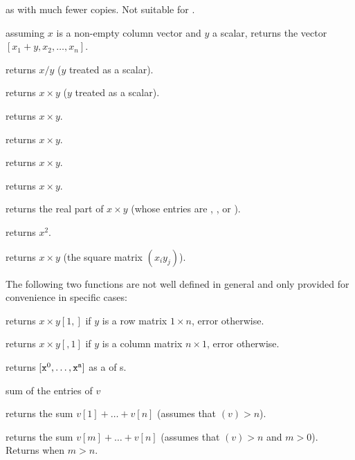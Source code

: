  as  with much
fewer copies. Not suitable for .

 assuming $x$ is a non-empty column vector
and $y$ a scalar, returns the vector $[x_1 + y, x_2,\dots,x_n]$.


 returns $x/y$ ($y$ treated as a scalar).



 returns $x\times y$ ($y$ treated as a
scalar).

 returns $x\times y$.

 returns $x\times y$.

 returns $x\times y$.

 returns $x\times y$.

 returns the real part of $x\times y$
(whose entries are , ,  or ).

 returns $x^2$.

 returns $x\times y$ (the square matrix
$(x_iy_j)$).

The following two functions are not well defined in general and only provided
for convenience in specific cases:

 returns $x\times y[1,]$ if $y$ is
a row matrix $1\times n$, error otherwise.

 returns $x\times y[,1]$ if $y$ is
a column matrix $n\times 1$, error otherwise.

 returns $[{\tt x}^0,
\dots, {\tt x}^{\tt n}]$ as a  of s.

\smallskip
{} sum of the entries of $v$

 returns the sum $v[1] + \dots + v[n]$
(assumes that $(v) > n$).

 returns the sum $v[m] + \dots +
v[n]$ (assumes that $(v) > n$ and $m > 0$). Returns 
when $m > n$.

